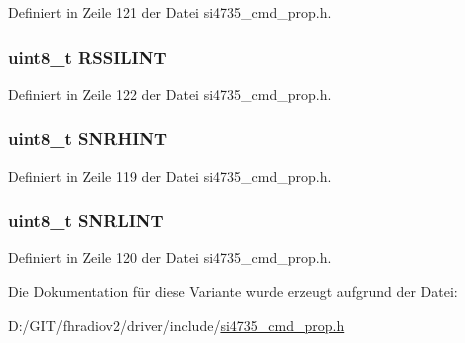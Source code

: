 Definiert in Zeile 121 der Datei si4735\+\_\+cmd\+\_\+prop.\+h.

\hypertarget{unionfm__rsq__status__resp1_ab4d0978420a010d6e43e4c2e5bca697c}{}
\subsubsection[{R\+S\+S\+I\+L\+I\+N\+T}]{\setlength{\rightskip}{0pt plus 5cm}uint8\+\_\+t R\+S\+S\+I\+L\+I\+N\+T}\label{unionfm__rsq__status__resp1_ab4d0978420a010d6e43e4c2e5bca697c}


Definiert in Zeile 122 der Datei si4735\+\_\+cmd\+\_\+prop.\+h.

\hypertarget{unionfm__rsq__status__resp1_a2cdca35f06dea322da5a107085b827a5}{}
\subsubsection[{S\+N\+R\+H\+I\+N\+T}]{\setlength{\rightskip}{0pt plus 5cm}uint8\+\_\+t S\+N\+R\+H\+I\+N\+T}\label{unionfm__rsq__status__resp1_a2cdca35f06dea322da5a107085b827a5}


Definiert in Zeile 119 der Datei si4735\+\_\+cmd\+\_\+prop.\+h.

\hypertarget{unionfm__rsq__status__resp1_a4c9935138813a5ab2dd82191c1003156}{}
\subsubsection[{S\+N\+R\+L\+I\+N\+T}]{\setlength{\rightskip}{0pt plus 5cm}uint8\+\_\+t S\+N\+R\+L\+I\+N\+T}\label{unionfm__rsq__status__resp1_a4c9935138813a5ab2dd82191c1003156}


Definiert in Zeile 120 der Datei si4735\+\_\+cmd\+\_\+prop.\+h.



Die Dokumentation für diese Variante wurde erzeugt aufgrund der Datei\+:\begin{DoxyCompactItemize}
\item 
D\+:/\+G\+I\+T/fhradiov2/driver/include/\hyperlink{si4735__cmd__prop_8h}{si4735\+\_\+cmd\+\_\+prop.\+h}\end{DoxyCompactItemize}
